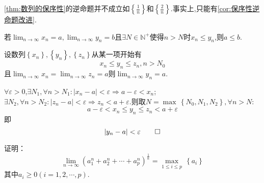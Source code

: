 \begin{red}
    \begin{remark}
        \cref{thm:数列的保序性}的逆命题并不成立如$\displaystyle \left\{\frac{1}{n}\right\}$和$\displaystyle \left\{\frac{2}{n}\right\}$.事实上,只能有\cref{cor:保序性逆命题改进}.
    \end{remark}
\end{red}
\begin{green}
    \begin{corollary}[保序性逆命题改进]\label{cor:保序性逆命题改进}
        若$\displaystyle \lim_{n\to\infty}x_n=a,\lim_{n\to\infty}y_n=b$且$\exists N\in\mathbb{N}^+$使得$n>N$时$x_n\leqslant y_n$,则$a\leqslant b.$
    \end{corollary}
\end{green}
\begin{formal}
    \begin{criterion}[夹逼准则]\label{cri:夹逼准则}
        设数列$\left\{x_n\right\},\left\{y_n\right\},\left\{z_n\right\}$从某一项开始有\[
        x_n\leqslant y_n\leqslant z_n,n>N_0
        \]且$\displaystyle \lim_{n\to\infty}x_n=\lim_{n\to\infty}z_n=a$则$\displaystyle\lim_{n\to\infty}y_n=a.$
    \end{criterion}
    \begin{Proof}
        $\forall\varepsilon>0$,$\exists N_1,\forall n>N_1:\left|x_n-a\right|<\varepsilon\Longrightarrow a-\varepsilon<x_n$;$\exists N_2,\forall n>N_2:\left|z_n-a\right|<\varepsilon\Longrightarrow z_n<a+\varepsilon$.则取$N=\max\,\left\{N_0,N_1,N_2\right\},\forall n>N:$\[
        a-\varepsilon<x_n\leqslant y_n\leqslant z_n<a+\varepsilon
        \]即\[
        \left|y_n-a\right|<\varepsilon\qedhere
        \]
    \end{Proof}
\end{formal}
\begin{brown}
    \begin{example}
        证明：\[
        \lim_{n\to\infty}\left(
            a_1^n+a_2^n+\cdots+a_p^n
        \right)^{\frac{1}{n}}=\max_{1\leqslant i\leqslant p}\,\left\{a_i\right\}
        \]其中$a_i\geqslant0\left(i=1,2,\cdots,p\right).$
    \end{example}
\end{brown}
